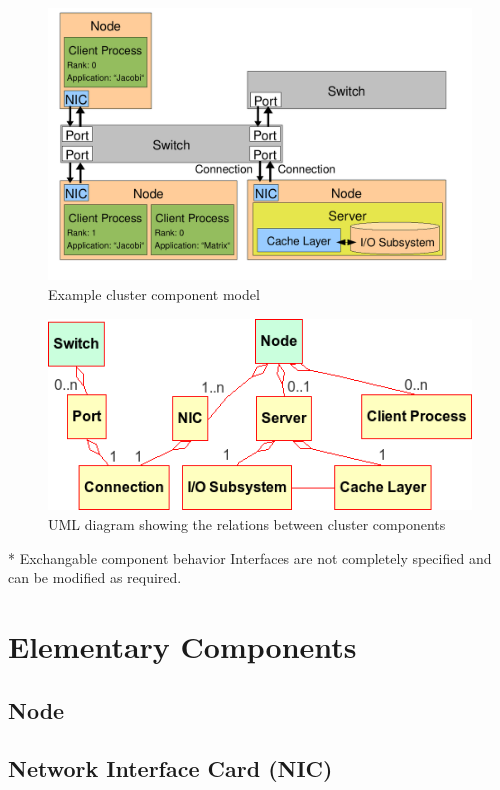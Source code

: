 \documentclass[
     11pt,         %
     a4paper,      %
     BCOR10mm,     %
     DIV14,        %
     liststotoc,   %
     bibtotoc,     %
     idxtotoc,     %
     parskip       %
     ]{scrreprt}   %
\begin{document}
\begin{figure}[!htbp]
  \centering
\includegraphics[scale=0.5]{Images/cluster-model.pdf}
    \caption{Example cluster component model}
    \label{fig:cluster-model}
\end{figure}

\begin{figure}[!htbp]
  \centering
\includegraphics[scale=0.5]{Images/cluster-components.png}
    \caption{UML diagram showing the relations between cluster components}
    \label{fig:cluster-relation}
\end{figure}


* Exchangable component behavior
  Interfaces are not completely specified and can be modified as required.

\section{Elementary Components}
\subsection{Node}
\subsection{Network Interface Card (NIC)}
\end{document}
